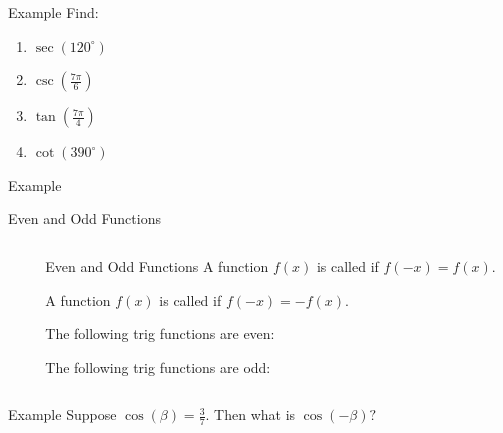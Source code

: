 \documentclass[presentation]{beamer}
\begin{document}
\begin{frame}[label={sec:orgc8c08e9}]{Example}
Find:
\begin{enumerate}
\item \(\sec(120^{\circ})\)
\item \(\csc\left(\frac{7\pi}{6}\right)\)
\item \(\tan\left(\frac{7\pi}{4}\right)\)
\item \(\cot(390^{\circ})\)
\end{enumerate}

\vspace{10in}
\end{frame}

\begin{frame}[label={sec:org108205a}]{Example}
\end{frame}

\begin{frame}[label={sec:orgd72816f}]{Even and Odd Functions}
\begin{columns}
\begin{column}{0.45\columnwidth}
\end{column}

\begin{column}{0.45\columnwidth}
\begin{block}{Even and Odd Functions}
A function \(f(x)\) is called \uline{\hspace*{1in}} if \(f(-x) = f(x)\).

A function \(f(x)\) is called \uline{\hspace*{1in}} if \(f(-x) = -f(x)\).

The following trig functions are even:
\vspace{0.5in}

The following trig functions are odd:
\vspace{0.5in}
\end{block}
\end{column}
\end{columns}
\end{frame}

\begin{frame}[label={sec:org7efe96b}]{Example}
Suppose \(\cos(\beta) = \frac{3}{7}.\) Then what is \(\cos(-\beta)?\)
\vspace{10in}
\end{frame}
\end{document}
